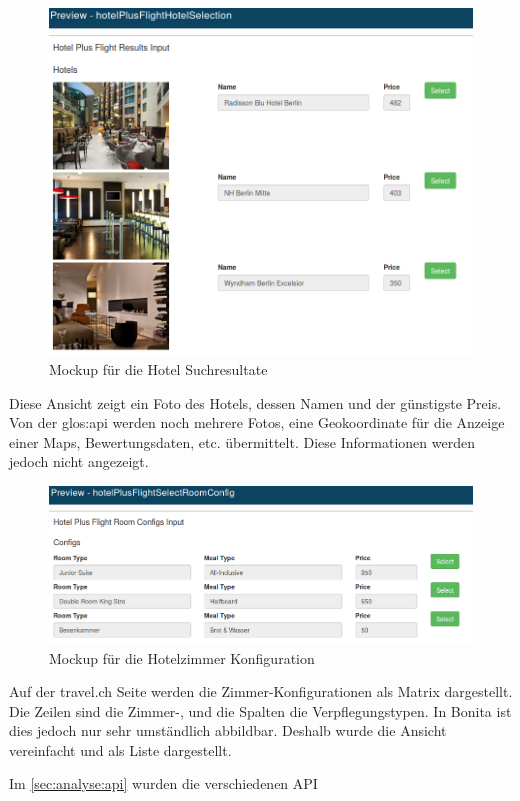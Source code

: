 \begin{figure}[H]
	\centering
	\includegraphics[width=1\textwidth]{images/forms-select-hotel.png}
	\caption{Mockup für die Hotel Suchresultate}
	\label{fig:konzept:mockups:selecthotel}
\end{figure}
Diese Ansicht zeigt ein Foto des Hotels, dessen Namen und der günstigste Preis. Von der \Gls{glos:api} werden noch mehrere Fotos, eine Geokoordinate für die Anzeige einer Maps, Bewertungsdaten, etc. übermittelt. Diese Informationen werden jedoch nicht angezeigt.

\begin{figure}[H]
	\centering
	\includegraphics[width=1\textwidth]{images/forms-select-roomconfig.png}
	\caption{Mockup für die Hotelzimmer Konfiguration}
	\label{fig:konzept:mockups:selectroomconfig}
\end{figure}
Auf der travel.ch Seite werden die Zimmer-Konfigurationen als Matrix dargestellt. Die Zeilen sind die Zimmer-, und die Spalten die Verpflegungstypen. In Bonita ist dies jedoch nur sehr umständlich abbildbar. Deshalb wurde die Ansicht vereinfacht und als Liste dargestellt.

Im \cref{sec:analyse:api}  wurden die verschiedenen API